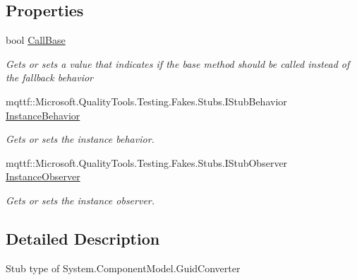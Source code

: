 \subsection*{Properties}
\begin{DoxyCompactItemize}
\item 
bool \hyperlink{class_system_1_1_component_model_1_1_fakes_1_1_stub_guid_converter_abd96819b074230bb44eba7bff9476c5d}{Call\-Base}
\begin{DoxyCompactList}\small\item\em Gets or sets a value that indicates if the base method should be called instead of the fallback behavior\end{DoxyCompactList}\item 
mqttf\-::\-Microsoft.\-Quality\-Tools.\-Testing.\-Fakes.\-Stubs.\-I\-Stub\-Behavior \hyperlink{class_system_1_1_component_model_1_1_fakes_1_1_stub_guid_converter_aa3c1033b48ef065ddedd8a50a93162e5}{Instance\-Behavior}
\begin{DoxyCompactList}\small\item\em Gets or sets the instance behavior.\end{DoxyCompactList}\item 
mqttf\-::\-Microsoft.\-Quality\-Tools.\-Testing.\-Fakes.\-Stubs.\-I\-Stub\-Observer \hyperlink{class_system_1_1_component_model_1_1_fakes_1_1_stub_guid_converter_a062d84f8d86469e9725be75a0f3d2587}{Instance\-Observer}
\begin{DoxyCompactList}\small\item\em Gets or sets the instance observer.\end{DoxyCompactList}\end{DoxyCompactItemize}


\subsection{Detailed Description}
Stub type of System.\-Component\-Model.\-Guid\-Converter



